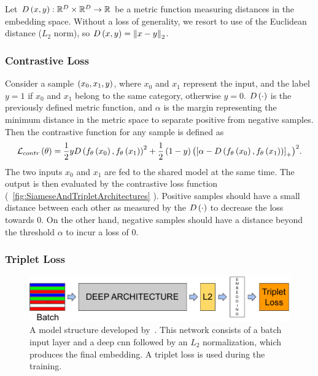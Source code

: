 Let ${D} \left( x, y \right): \mathbb{R}^D \times \mathbb{R}^D \to \mathbb{R}$ be a metric function measuring distances in the embedding space. Without a loss of generality, we resort to use of the Euclidean distance ($L_2$ norm), so ${D} \left( x, y \right) = {\left\Vert {x - y} \right\Vert}_2$.

\subsubsection{Contrastive Loss}

Consider a sample $\left( {x_0, x_1, y} \right)$, where $x_0$ and $x_1$ represent the input, and the label $y = 1$ if $x_0$ and $x_1$ belong to the same category, otherwise $y = 0$. ${D} \left( \cdot \right)$ is the previously defined metric function, and $\alpha$ is the margin representing the minimum distance in the metric space to separate positive from negative samples. Then the contrastive function for any sample is defined as~\cite{hadsell2006dimreduction}
\begin{equation}
    \label{eq:ContrastiveLoss}
    {\mathcal{L}_{contr}} \left( \theta \right) =
    \frac{1}{2}y
    {{D} \left( {f_\theta} \left( x_0 \right), {f_\theta} \left( x_1 \right) \right)}^2 +
    \frac{1}{2}
    \left( {1 - y} \right) {\left( {
            \left[ {\alpha - {D} \left( {f_\theta} \left( x_0 \right), {f_\theta} \left( x_1 \right) \right)} \right]_{+}} \right)}^2.
\end{equation}
The two inputs $x_0$ and $x_1$ are fed to the shared model at the same time. The output is then evaluated by the contrastive loss function (\figtext{}~\ref{fig:SiameseAndTripletArchitectures} ). Positive samples should have a small distance between each other as measured by the ${D} \left( \cdot \right)$ to decrease the loss towards $0$. On the other hand, negative samples should have a distance beyond the threshold $\alpha$ to incur a loss of $0$.

\subsubsection{Triplet Loss}

\begin{figure}[t]
    \centerline{\includegraphics[width=0.7\linewidth]{figures/theoretical_foundations/triplet_loss_model_structure.pdf}}
    \caption[Triplet loss architecture]{A model structure developed by~\cite{schroff2015facenet}. This network consists of a batch input layer and a deep \gls{cnn} followed by an $L_2$ normalization, which produces the final embedding. A triplet loss is used during the training. }
    \label{fig:TripletLossModelStructure}
\end{figure}

